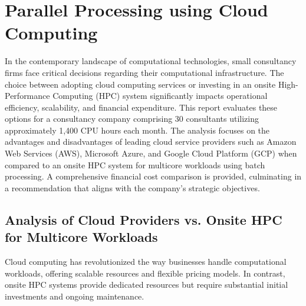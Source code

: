 \documentclass{article}
\begin{document}
\begin{cwauthorlist}
\end{cwauthorlist}

\section{Parallel Processing using Cloud Computing}

In the contemporary landscape of computational technologies, small consultancy firms face critical decisions regarding their computational infrastructure. The choice between adopting cloud computing services or investing in an onsite High-Performance Computing (HPC) system significantly impacts operational efficiency, scalability, and financial expenditure. This report evaluates these options for a consultancy company comprising 30 consultants utilizing approximately 1,400 CPU hours each month. The analysis focuses on the advantages and disadvantages of leading cloud service providers such as Amazon Web Services (AWS), Microsoft Azure, and Google Cloud Platform (GCP) when compared to an onsite HPC system for multicore workloads using batch processing. A comprehensive financial cost comparison is provided, culminating in a recommendation that aligns with the company's strategic objectives.

\subsection{Analysis of Cloud Providers vs. Onsite HPC for Multicore Workloads}

Cloud computing has revolutionized the way businesses handle computational workloads, offering scalable resources and flexible pricing models. In contrast, onsite HPC systems provide dedicated resources but require substantial initial investments and ongoing maintenance.
\end{document}

